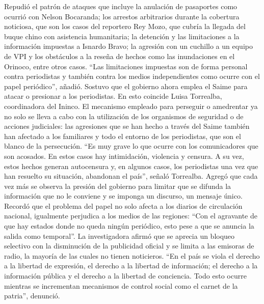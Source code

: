 \documentclass{article}%
\begin{document}
\newline%
%
Repudió el patrón de ataques que incluye la anulación de pasaportes como ocurrió con Nelson Bocaranda; los arrestos arbitrarios durante la cobertura noticiosa, que son los casos del reportero Rey Mozo, que cubría la llegada del buque chino con asistencia humanitaria; la detención y las limitaciones a la información impuestas a Isnardo Bravo; la agresión con un cuchillo a un equipo de VPI y los obstáculos a la reseña de hechos como las inundaciones en el Orinoco, entre otros casos.%
\newline%
%
“Las limitaciones impuestas son de forma personal contra periodistas y también contra los medios independientes como ocurre con el papel periódico”, añadió.%
\newline%
%
Sostuvo que el gobierno ahora emplea el Saime para atacar o presionar a los periodistas. En esto coincide Luisa Torrealba, coordinadora del Ininco. El mecanismo empleado para perseguir o amedrentar ya no solo se lleva a cabo con la utilización de los organismos de seguridad o de acciones judiciales: las agresiones que se han hecho a través del Saime también han afectado a los familiares y todo el entorno de los periodistas, que son el blanco de la persecución.%
\newline%
%
“Es muy grave lo que ocurre con los comunicadores que son acosados. En estos casos hay intimidación, violencia y censura. A su vez, estos hechos generan autocensura y, en algunos casos, los periodistas una vez que han resuelto su situación, abandonan el país”, señaló Torrealba.%
\newline%
%
Agregó que cada vez más se observa la presión del gobierno para limitar que se difunda la información que no le conviene y se imponga un discurso, un mensaje único.%
\newline%
%
Recordó que el problema del papel no solo afecta a los diarios de circulación nacional, igualmente perjudica a los medios de las regiones: “Con el agravante de que hay estados donde no queda ningún periódico, esto pese a que se anuncia la salida como temporal”.%
\newline%
%
La investigadora afirmó que se aprecia un bloqueo selectivo con la disminución de la publicidad oficial y se limita a las emisoras de radio, la mayoría de las cuales no tienen noticieros.%
\newline%
%
“En el país se viola el derecho a la libertad de expresión, el derecho a la libertad de información; el derecho a la información pública y el derecho a la libertad de conciencia. Todo esto ocurre mientras se incrementan mecanismos de control social como el carnet de la patria”, denunció.%
\end{document}
